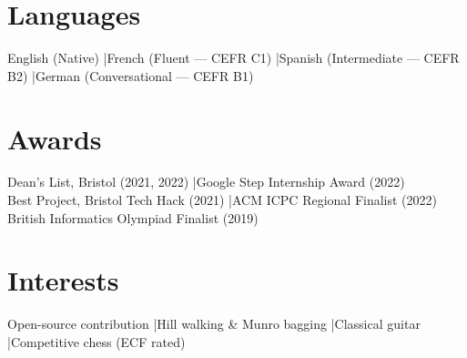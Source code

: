 \documentclass[11pt,a4paper]{article}
\begin{document}
\vspace{8pt}

\section*{Languages}

\noindent
English (Native) \quad|\quad French (Fluent — CEFR C1) \quad|\quad Spanish (Intermediate — CEFR B2) \quad|\quad German (Conversational — CEFR B1)

\vspace{8pt}

\section*{Awards}

\noindent
Dean's List, Bristol (2021, 2022) \quad|\quad Google Step Internship Award (2022)\\[2pt]
Best Project, Bristol Tech Hack (2021) \quad|\quad ACM ICPC Regional Finalist (2022)\\[2pt]
British Informatics Olympiad Finalist (2019)

\vspace{8pt}

\section*{Interests}

\noindent
Open-source contribution \quad|\quad Hill walking \& Munro bagging \quad|\quad Classical guitar \quad|\quad Competitive chess (ECF rated)
\end{document}
